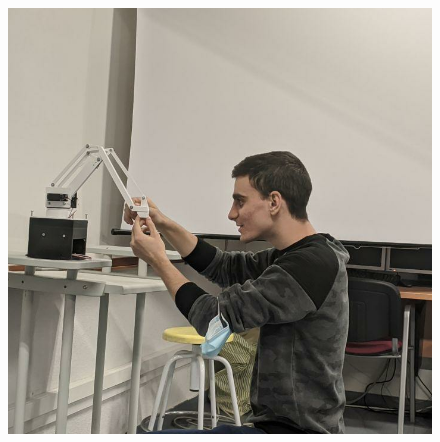 \begin{figure}[H]
\begin{minipage}{.32\linewidth}
    \end{minipage}
    \hfill
    \begin{minipage}{.32\linewidth}
        \includegraphics[width=\linewidth]{pictures/bye_alex2.png}
    \end{minipage}
\end{figure}